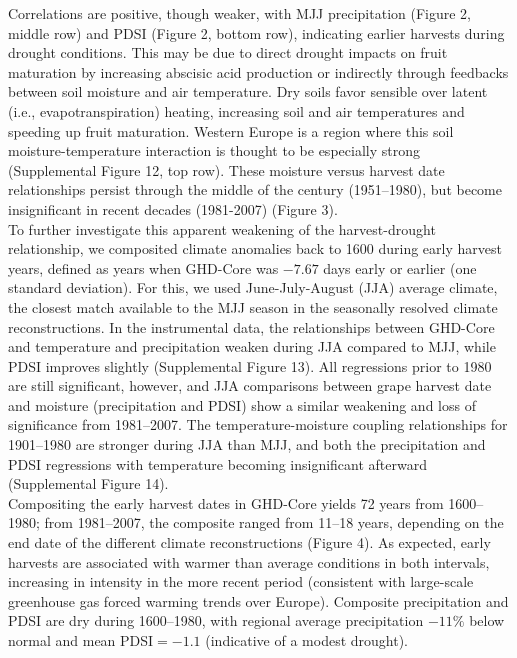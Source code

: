 \documentclass[final]{nature}
\begin{document}
\indent Correlations are positive, though weaker, with MJJ precipitation (Figure 2, middle row) and PDSI (Figure 2, bottom row), indicating earlier harvests during drought conditions. This may be due to direct drought impacts on fruit maturation by increasing abscisic acid production\cite{webb2012} or indirectly through feedbacks between soil moisture and air temperature. Dry soils favor sensible over latent (i.e., evapotranspiration) heating, increasing soil and air temperatures and speeding up fruit maturation. Western Europe is a region where this soil moisture-temperature interaction is thought to be especially strong\cite{Seneviratne2006} (Supplemental Figure 12, top row). These moisture versus harvest date relationships persist through the middle of the century (1951--1980), but become insignificant in recent decades (1981-2007) (Figure 3).\\
\indent To further investigate this apparent weakening of the harvest-drought relationship, we composited climate anomalies back to 1600 during early harvest years, defined as years when GHD-Core was $-7.67$ days early or earlier (one standard deviation). For this, we used June-July-August (JJA) average climate, the closest match available to the MJJ season in the seasonally resolved climate reconstructions. In the instrumental data, the relationships between GHD-Core and temperature and precipitation weaken during JJA compared to MJJ, while PDSI improves slightly (Supplemental Figure 13). All regressions prior to 1980 are still significant, however, and JJA comparisons between grape harvest date and moisture (precipitation and PDSI) show a similar weakening and loss of significance from 1981--2007. The temperature-moisture coupling relationships for 1901--1980 are stronger during JJA than MJJ, and both the precipitation and PDSI regressions with temperature becoming insignificant afterward (Supplemental Figure 14).\\ 
\indent Compositing the early harvest dates in GHD-Core yields 72 years from 1600--1980; from 1981--2007, the composite ranged from 11--18 years, depending on the end date of the different climate reconstructions (Figure 4). As expected, early harvests are associated with warmer than average conditions in both intervals, increasing in intensity in the more recent period (consistent with large-scale greenhouse gas forced warming trends over Europe). Composite precipitation and PDSI are dry during 1600--1980, with regional average precipitation $-11\%$ below normal and mean PDSI$=-1.1$ (indicative of a modest drought).\\
\end{document}
